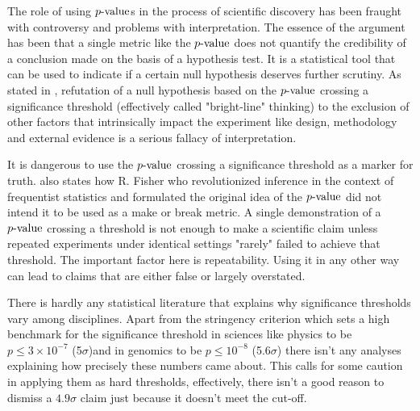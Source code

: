 The role of using $\mathop{p{\textnormal{-value}}}$s in the process of scientific discovery has been fraught with controversy and problems with interpretation.  The essence of the argument has been that a single metric like the $\mathop{p{\textnormal{-value}}}$ does not quantify the credibility of a conclusion made on the basis of a hypothesis test. It is a statistical tool that can be used to indicate if a certain null hypothesis deserves further scrutiny. As stated in \cite{goodman}, refutation of a null hypothesis based on the $\mathop{p{\textnormal{-value}}}$ crossing a significance threshold (effectively called "bright-line" thinking) to the exclusion of other factors that intrinsically impact the experiment like design, methodology and external evidence is a serious fallacy of interpretation.  

It is dangerous to use the $\mathop{p{\textnormal{-value}}}$ crossing a significance threshold as a marker for truth. \cite{goodman} also states how R. Fisher who revolutionized inference in the context of frequentist statistics and formulated the original idea of the $\mathop{p{\textnormal{-value}}}$ did not intend it to be used as a make or break metric. A single demonstration of a $\mathop{p{\textnormal{-value}}}$ crossing a threshold is not enough to make a scientific claim unless repeated experiments under identical settings "rarely" failed to achieve that threshold. The important factor here is repeatability. Using it in any other way can lead to claims that are either false or largely overstated. 

There is hardly any statistical literature that explains why significance thresholds vary among disciplines. Apart from the stringency criterion which sets a high benchmark for the significance threshold in sciences like physics to be $p \leq 3 \times 10^{-7}$ (5$\sigma$)and in genomics to be $p \leq 10^{-8}$ (5.6$\sigma$) there isn't any analyses explaining how precisely these numbers came about. This calls for some caution in applying them as hard thresholds, effectively, there isn't a good reason to dismiss a $4.9\sigma$ claim just because it doesn't meet the cut-off.









